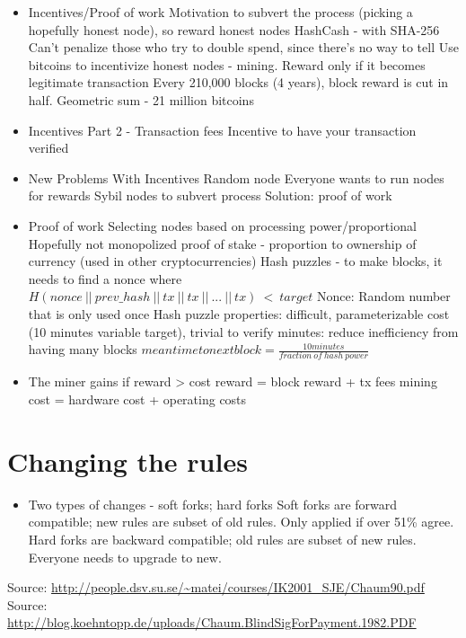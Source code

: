\documentclass{article}
\begin{document}
\begin{itemize}
  \item Incentives/Proof of work
    \subitem Motivation to subvert the process (picking a hopefully honest node), so reward honest nodes
    \subitem HashCash - with SHA-256
    \subitem Can't penalize those who try to double spend, since there's no way to tell
    \subitem Use bitcoins to incentivize honest nodes - mining. Reward only if it becomes legitimate transaction
    \subitem Every 210,000 blocks (4 years), block reward is cut in half. Geometric sum - 21 million bitcoins
  \item Incentives Part 2 - Transaction fees
    \subitem Incentive to have your transaction verified
  \item New Problems With Incentives
    \subitem Random node
    \subitem Everyone wants to run nodes for rewards
    \subitem Sybil nodes to subvert process
    \subitem Solution: proof of work
  \item Proof of work
    \subitem Selecting nodes based on processing power/proportional
    \subitem Hopefully not monopolized
    \subitem proof of stake - proportion to ownership of currency (used in other cryptocurrencies)
    \subitem Hash puzzles - to make blocks, it needs to find a nonce where\\
    $ H(nonce\ ||\ prev\_hash\ ||\ tx\ ||\ tx\ ||\ ...\ ||\ tx)\ <\ target $
    \subitem Nonce: Random number that is only used once
    \subitem Hash puzzle properties: difficult, parameterizable cost (10 minutes variable target), trivial to verify
     minutes: reduce inefficiency from having many blocks
    \subitem $ mean time to next block = \frac{10 minutes}{fraction\ of\ hash\ power} $
  \item The miner gains if reward > cost
    \subitem reward = block reward + tx fees
    \subitem mining cost = hardware cost + operating costs
\end{itemize}


\section*{Changing the rules}
\begin{itemize}
  \item Two types of changes - soft forks; hard forks
    \subitem Soft forks are forward compatible; new rules are subset of old rules. Only applied if over 51\% agree.
    \subitem Hard forks are backward compatible; old rules are subset of new rules. Everyone needs to upgrade to new.
\end{itemize}



Source: \url{http://people.dsv.su.se/~matei/courses/IK2001_SJE/Chaum90.pdf}\\
Source: \url{http://blog.koehntopp.de/uploads/Chaum.BlindSigForPayment.1982.PDF}
\end{document}

